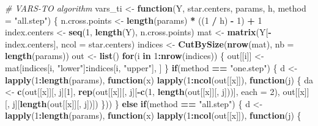 \documentclass[11pt,]{article}
\newenvironment{Shaded}{\begin{snugshade}}{\end{snugshade}}
\newcommand{\CommentTok}[1]{\textcolor[rgb]{0.56,0.35,0.01}{\textit{#1}}}
\newcommand{\ControlFlowTok}[1]{\textcolor[rgb]{0.13,0.29,0.53}{\textbf{#1}}}
\newcommand{\DataTypeTok}[1]{\textcolor[rgb]{0.13,0.29,0.53}{#1}}
\newcommand{\DecValTok}[1]{\textcolor[rgb]{0.00,0.00,0.81}{#1}}
\newcommand{\KeywordTok}[1]{\textcolor[rgb]{0.13,0.29,0.53}{\textbf{#1}}}
\newcommand{\NormalTok}[1]{#1}
\newcommand{\OperatorTok}[1]{\textcolor[rgb]{0.81,0.36,0.00}{\textbf{#1}}}
\newcommand{\StringTok}[1]{\textcolor[rgb]{0.31,0.60,0.02}{#1}}
\begin{document}
\begin{Shaded}
\begin{Highlighting}[]
{{\CommentTok{# VARS-TO algorithm}
\NormalTok{vars_ti <-}\StringTok{ }\ControlFlowTok{function}\NormalTok{(Y, star.centers, params, h, }\DataTypeTok{method =} \StringTok{"all.step"}\NormalTok{) \{}
\NormalTok{  n.cross.points <-}\StringTok{ }\KeywordTok{length}\NormalTok{(params) }\OperatorTok{*}\StringTok{ }\NormalTok{((}\DecValTok{1} \OperatorTok{/}\StringTok{ }\NormalTok{h) }\OperatorTok{-}\StringTok{ }\DecValTok{1}\NormalTok{) }\OperatorTok{+}\StringTok{ }\DecValTok{1}
\NormalTok{  index.centers <-}\StringTok{ }\KeywordTok{seq}\NormalTok{(}\DecValTok{1}\NormalTok{, }\KeywordTok{length}\NormalTok{(Y), n.cross.points)}
\NormalTok{  mat <-}\StringTok{ }\KeywordTok{matrix}\NormalTok{(Y[}\OperatorTok{-}\NormalTok{index.centers], }\DataTypeTok{ncol =}\NormalTok{ star.centers)}
\NormalTok{  indices <-}\StringTok{ }\KeywordTok{CutBySize}\NormalTok{(}\KeywordTok{nrow}\NormalTok{(mat), }\DataTypeTok{nb =} \KeywordTok{length}\NormalTok{(params))}
\NormalTok{  out <-}\StringTok{ }\KeywordTok{list}\NormalTok{()}
  \ControlFlowTok{for}\NormalTok{(i }\ControlFlowTok{in} \DecValTok{1}\OperatorTok{:}\KeywordTok{nrow}\NormalTok{(indices)) \{}
\NormalTok{    out[[i]] <-}\StringTok{ }\NormalTok{mat[indices[i, }\StringTok{"lower"}\NormalTok{]}\OperatorTok{:}\NormalTok{indices[i, }\StringTok{"upper"}\NormalTok{], ]}
\NormalTok{  \}}
  \ControlFlowTok{if}\NormalTok{(method }\OperatorTok{==}\StringTok{ "one.step"}\NormalTok{) \{}
\NormalTok{    d <-}\StringTok{ }\KeywordTok{lapply}\NormalTok{(}\DecValTok{1}\OperatorTok{:}\KeywordTok{length}\NormalTok{(params), }\ControlFlowTok{function}\NormalTok{(x) }
      \KeywordTok{lapply}\NormalTok{(}\DecValTok{1}\OperatorTok{:}\KeywordTok{ncol}\NormalTok{(out[[x]]), }\ControlFlowTok{function}\NormalTok{(j) \{}
\NormalTok{        da <-}\StringTok{ }\KeywordTok{c}\NormalTok{(out[[x]][, j][}\DecValTok{1}\NormalTok{], }
                \KeywordTok{rep}\NormalTok{(out[[x]][, j][}\OperatorTok{-}\KeywordTok{c}\NormalTok{(}\DecValTok{1}\NormalTok{, }\KeywordTok{length}\NormalTok{(out[[x]][, j]))], }\DataTypeTok{each =} \DecValTok{2}\NormalTok{), }
\NormalTok{                out[[x]][, j][}\KeywordTok{length}\NormalTok{(out[[x]][, j])])}
\NormalTok{      \}))}
\NormalTok{  \} }\ControlFlowTok{else} \ControlFlowTok{if}\NormalTok{(method }\OperatorTok{==}\StringTok{ "all.step"}\NormalTok{) \{}
\NormalTok{    d <-}\StringTok{ }\KeywordTok{lapply}\NormalTok{(}\DecValTok{1}\OperatorTok{:}\KeywordTok{length}\NormalTok{(params), }\ControlFlowTok{function}\NormalTok{(x) }
      \KeywordTok{lapply}\NormalTok{(}\DecValTok{1}\OperatorTok{:}\KeywordTok{ncol}\NormalTok{(out[[x]]), }\ControlFlowTok{function}\NormalTok{(j) \{}
}}
\end{Highlighting}
\end{Shaded}
\end{document}
